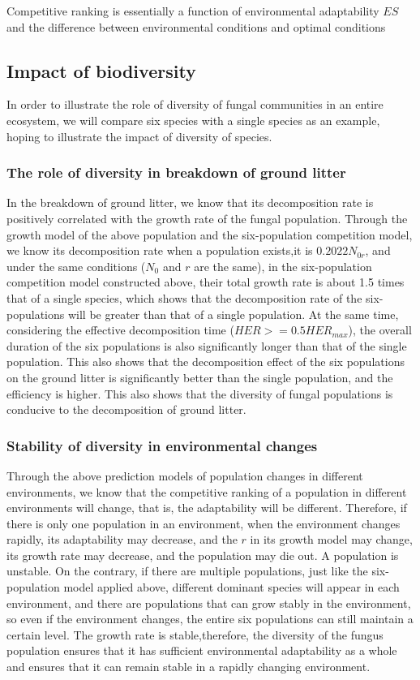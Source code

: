 \documentclass{mcmthesis}
\begin{document}
Competitive ranking is essentially a function of environmental adaptability $ES$ and the difference between environmental conditions and optimal conditions

\subsection{Impact of biodiversity}
In order to illustrate the role of diversity of fungal communities in an entire ecosystem, we will compare six species with a single species as an example, hoping to illustrate the impact of diversity of species.
\subsubsection{The role of diversity in breakdown of ground litter}
In the breakdown of ground litter, we know that its decomposition rate is positively correlated with the growth rate of the fungal population. Through the growth model of the above population and the six-population competition model, we know its decomposition rate when a population exists,it is $0.2022N_{0r}$, and under the same conditions ($N_{0}$ and $r$ are the same), in the six-population competition model constructed above, their total growth rate is about 1.5 times that of a single species, which shows that the decomposition rate of the six-populations will be greater than that of a single population. At the same time, considering the effective decomposition time ($HER>=0.5HER_{max}$), the overall duration of the six populations is also significantly longer than that of the single population. This also shows that the decomposition effect of the six populations on the ground litter is significantly better than the single population, and the efficiency is higher. This also shows that the diversity of fungal populations is conducive to the decomposition of ground litter.
\subsubsection{Stability of diversity in environmental changes}
Through the above prediction models of population changes in different environments, we know that the competitive ranking of a population in different environments will change, that is, the adaptability will be different. Therefore, if there is only one population in an environment, when the environment changes rapidly, its adaptability may decrease, and the $r$ in its growth model may change, its growth rate may decrease, and the population may die out. A population is unstable. On the contrary, if there are multiple populations, just like the six-population model applied above, different dominant species will appear in each environment, and there are populations that can grow stably in the environment, so even if the environment changes, the entire six populations can still maintain a certain level. The growth rate is stable,therefore, the diversity of the fungus population ensures that it has sufficient environmental adaptability as a whole and ensures that it can remain stable in a rapidly changing environment.
\end{document}
